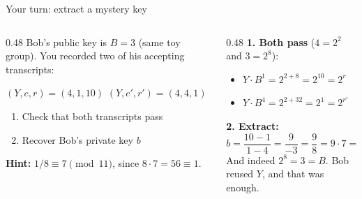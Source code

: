 \ifdefined\PRESENTATION\else\PassOptionsToClass{handout}{beamer}\fi\documentclass[aspectratio=169, lualatex]{beamer}
\begin{document}
\begin{frame}{Your turn: extract a mystery key}
	\begin{columns}[T]
		\begin{column}{0.48\textwidth}
			Bob's public key is $B = 3$ (same toy group). You recorded two of his accepting transcripts:
			\begin{center}
				$(Y, c, r) = (4, 1, 10)$ \qquad $(Y, c', r') = (4, 4, 1)$
			\end{center}
			\begin{enumerate}
				\item Check that both transcripts pass
				\item Recover Bob's private key $b$
			\end{enumerate}
			\textbf{Hint:} $1/8 \equiv 7 \pmod{11}$, since $8 \cdot 7 = 56 \equiv 1$.
		\end{column}
		\begin{column}{0.48\textwidth}
			\pause
			\textbf{1. Both pass} ($4 = 2^2$ and $3 = 2^8$):
			\begin{itemize}
				\item $Y \cdot B^{1} = 2^{2 + 8} = 2^{10} = 2^{r}$ \mycheckmark
				\item $Y \cdot B^{4} = 2^{2 + 32} = 2^{1} = 2^{r'}$ \mycheckmark
			\end{itemize}
			\pause
			\textbf{2. Extract:}
			\[
				b = \frac{10 - 1}{1 - 4} = \frac{9}{-3} = \frac{9}{8} = 9 \cdot 7 = 63 \equiv 8
			\]
			And indeed $2^8 = 3 = B$. Bob reused $Y$, and that was enough.
		\end{column}
	\end{columns}
\end{frame}
\end{document}

